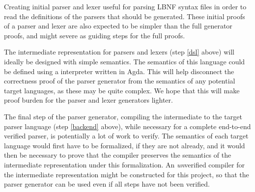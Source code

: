 \documentclass{article}
\begin{document}
	Creating initial parser and lexer useful for parsing LBNF syntax files in
	order to read the definitions of the parsers that should be generated.
	These initial proofs of a parser and lexer are also expected to be simpler
	than the full generator proofs, and might severe as guiding steps for the
	full proofs.

	The intermediate representation for parsers and lexers (step \ref{dsl}
	above) will ideally be designed with simple semantics. The semantics of
	this language could be defined using a interpreter written in Agda. This
	will help disconnect the correctness proof of the parser generator from the
	semantics of any potential target languages, as these may be quite complex.
	We hope that this will make proof burden for the parser and lexer
	generators lighter.


	The final step of the parser generator, compiling the intermediate to the
	target parser language (step \ref{backend} above), while necessary for a
	complete end-to-end verified parser, is potentially a lot of work to
	verify. The semantics of each target language would first have to be
	formalized, if they are not already, and it would then be necessary to
	prove that the compiler preserves the semantics of the intermediate
	representation under this formalization. An \emph{un}verified compiler for
	the intermediate representation might be constructed for this project, so
	that the parser generator can be used even if all steps have not been
	verified.




\newpage




\end{document}
